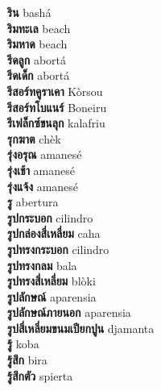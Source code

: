 \textbf{ ริน  } bashá \\
\textbf{ ริมทะเล  } beach \\
\textbf{ ริมหาด  } beach \\
\textbf{ รีดลูก  } abortá \\
\textbf{ รีดเด็ก  } abortá \\
\textbf{ รีสอร์ทคูราเคา  } Kòrsou \\
\textbf{ รีสอร์ทโบแนร์  } Boneiru \\
\textbf{ รีเฟล็กซ์ขนลุก  } kalafriu \\
\textbf{ รุกฆาต  } chèk \\
\textbf{ รุ่งอรุณ  } amanesé \\
\textbf{ รุ่งเช้า  } amanesé \\
\textbf{ รุ่งแจ้ง  } amanesé \\
\textbf{ รู  } abertura \\
\textbf{ รูปกระบอก  } cilindro \\
\textbf{ รูปกล่องสี่เหลี่ยม  } caha \\
\textbf{ รูปทรงกระบอก  } cilindro \\
\textbf{ รูปทรงกลม  } bala \\
\textbf{ รูปทรงสี่เหลี่ยม  } blòki \\
\textbf{ รูปลักษณ์  } aparensia \\
\textbf{ รูปลักษณ์ภายนอก  } aparensia \\
\textbf{ รูปสี่เหลี่ยมขนมเปียกปูน  } djamanta \\
\textbf{ รู้  } koba \\
\textbf{ รู้สึก  } bira \\
\textbf{ รู้สึกตัว  } spierta \\
